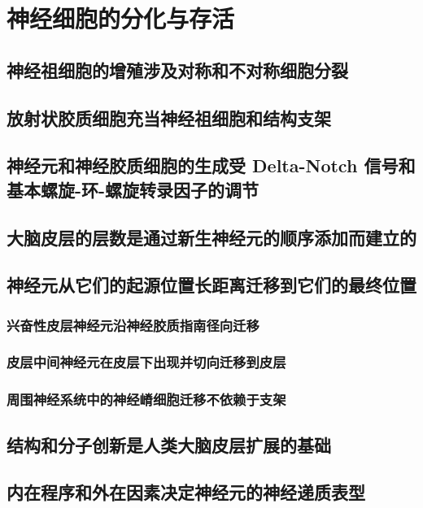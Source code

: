 \chapter{神经细胞的分化与存活}

\section{神经祖细胞的增殖涉及对称和不对称细胞分裂}

\section{放射状胶质细胞充当神经祖细胞和结构支架}

\section{神经元和神经胶质细胞的生成受 Delta-Notch 信号和基本螺旋-环-螺旋转录因子的调节}

\section{大脑皮层的层数是通过新生神经元的顺序添加而建立的}

\section{神经元从它们的起源位置长距离迁移到它们的最终位置}
\subsection{兴奋性皮层神经元沿神经胶质指南径向迁移}
\subsection{皮层中间神经元在皮层下出现并切向迁移到皮层}
\subsection{周围神经系统中的神经嵴细胞迁移不依赖于支架}

\section{结构和分子创新是人类大脑皮层扩展的基础}

\section{内在程序和外在因素决定神经元的神经递质表型}
